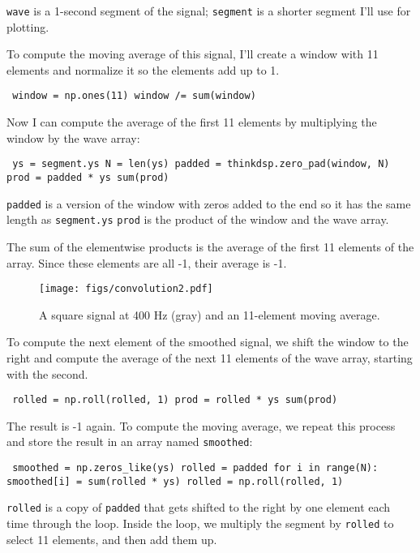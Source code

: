 \documentclass[12pt]{book} \usepackage[width=5.5in,height=8.5in, hmarginratio=3:2,vmarginratio=1:1]{geometry}
\begin{document}
{\tt wave} is a 1-second segment of the signal; {\tt segment} is a shorter segment I'll use for plotting. 

To compute the moving average of this signal, I'll create a window with 11 elements and normalize it so the elements add up to 1. 

\begin{verbatim} window = np.ones(11) window /= sum(window) \end{verbatim} 

Now I can compute the average of the first 11 elements by multiplying the window by the wave array: 

\begin{verbatim} ys = segment.ys N = len(ys) padded = thinkdsp.zero_pad(window, N) prod = padded * ys sum(prod) \end{verbatim} 

{\tt padded} is a version of the window with zeros added to the end so it has the same length as {\tt segment.ys} {\tt prod} is the product of the window and the wave array. 

The sum of the elementwise products is the average of the first 11 elements of the array. Since these elements are all -1, their average is -1. 

\begin{figure} 

\centerline{\texttt{[image: figs/convolution2.pdf]}} \caption{A square signal at 400 Hz (gray) and an 11-element moving average.} \label{fig.convolution2} \end{figure} 

To compute the next element of the smoothed signal, we shift the window to the right and compute the average of the next 11 elements of the wave array, starting with the second. 

\begin{verbatim} rolled = np.roll(rolled, 1) prod = rolled * ys sum(prod) \end{verbatim} 

The result is -1 again. To compute the moving average, we repeat this process and store the result in an array named {\tt smoothed}: 

\begin{verbatim} smoothed = np.zeros_like(ys) rolled = padded for i in range(N): smoothed[i] = sum(rolled * ys) rolled = np.roll(rolled, 1) \end{verbatim} 

{\tt rolled} is a copy of {\tt padded} that gets shifted to the right by one element each time through the loop. Inside the loop, we multiply the segment by {\tt rolled} to select 11 elements, and then add them up. 
\end{document}
